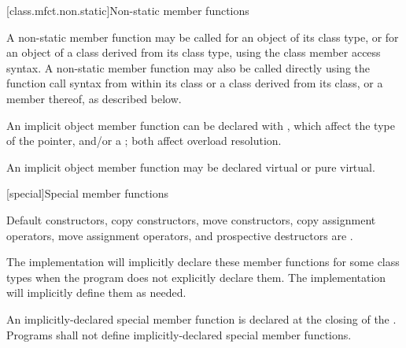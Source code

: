 [class.mfct.non.static]{Non-static member functions}%


\pnum
A non-static member function may be called for an object of
its class type, or for an object of a class derived
from its class type, using the class member
access syntax. A non-static
member function may also be called directly using the function call
syntax from within
its class or a class derived from its class, or
a member thereof, as described below.

\pnum
{}%
%
%
\begin{note}
An implicit object member function can be declared with
, which affect the type of the 
pointer,
and/or a ;
both affect overload resolution.
\end{note}

\pnum
An implicit object member function may be declared
virtual or pure virtual.

[special]{Special member functions}

%
%
%

\pnum
{}%
%
%
%
%
Default constructors,
copy constructors, move constructors,
copy assignment operators, move assignment operators,
and prospective destructors are
.
\begin{note}
The implementation will implicitly declare these member functions for some class
types when the program does not explicitly declare them.
The implementation will implicitly define them
as needed.
\end{note}
An implicitly-declared special member function is declared at the closing
\tcode{\}} of the .
Programs shall not define implicitly-declared special member functions.


